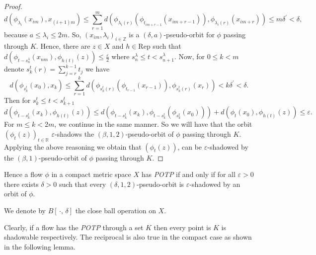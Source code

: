\documentclass{amsart}
\theoremstyle{definition}
\newcommand{\ep}{\varepsilon}
\begin{document}
\begin{proof}
$$d(\phi_{\lambda_i}(x_{im}),x_{(i+1)m})\leq \sum_{r=1}^{m}d(\phi_{\lambda_i(r)}(\phi_{t_{im+r-1}}(x_{im+r-1})),\phi_{\lambda_i(r)}(x_{im+r}))\leq m\delta^{\prime}<\delta,$$ 
because $a\leq \lambda_i\leq 2m$. So, $(x_{im},\lambda_i)_{i\in \mathbb{Z}}$ is a $(\delta,a)$-pseudo-orbit for $\phi$ passing through $K$. Hence, there are $z\in X$ and $h\in \mathrm{Rep}$ such that $d(\phi_{t-s^{\lambda}_n}(x_{nm}),\phi_{h(t)}(z))\leq \frac{\ep}{2}$ where $s^{\lambda}_n\leq t< s^{\lambda}_{n+1}$. Now, for $0\leq k<m$ denote $s^{t}_k(r)=\sum_{j=r}^{k-1}t_j$ we have
$$d(\phi_{s^{t}_k}(x_0),x_k)\leq \sum_{r=1}^{k}d(\phi_{s^{t}_k(r)}(\phi_{t_{r-1}}(x_{r-1})),\phi_{s^{t}_k(r)}(x_r))<k\delta^{\prime}<\delta.$$ Then for $s^{t}_k\leq t<s^{t}_{k+1}$ $$d(\phi_{t-s^{t}_k}(x_k),\phi_{h(t)}(z))\leq d(\phi_{t-s^{t}_k}(x_k),\phi_{t-s^{t}_k}(\phi_{s^{t}_k}(x_0)))+d(\phi_{t}(x_0),\phi_{h(t)}(z))\leq \ep.$$
For $m\leq k<2m$, we continue in the same manner. So we will have that the orbit $(\phi_t(z))_{t\in\mathbb{R}}$  $\ep$-shadows the $(\beta,1,2)$-pseudo-orbit of $\phi$ passing through $K$. Applying the above reasoning we obtain that $(\phi_t(z))$,  can be $\ep$-shadowed by the $(\beta,1)$-pseudo-orbit of $\phi$ passing through $K$.
\end{proof}

Hence a flow $\phi$ in a compact metric space $X$ has {\em POTP}  if and only if for all $\ep>0$ there exists $\delta>0$ such that every $(\delta,1,2)$-pseudo-orbit is $\ep$-shadowed by an orbit of $\phi$.

We denote by $B[\,\cdot,\,\delta]$ the close ball operation on $X$. 

Clearly, if a flow has the {\em POTP} through a set $K$ then every point is $K$ is shadowable respectively. The reciprocal is also true in the compact case as shown in the following lemma. 
\end{document}

